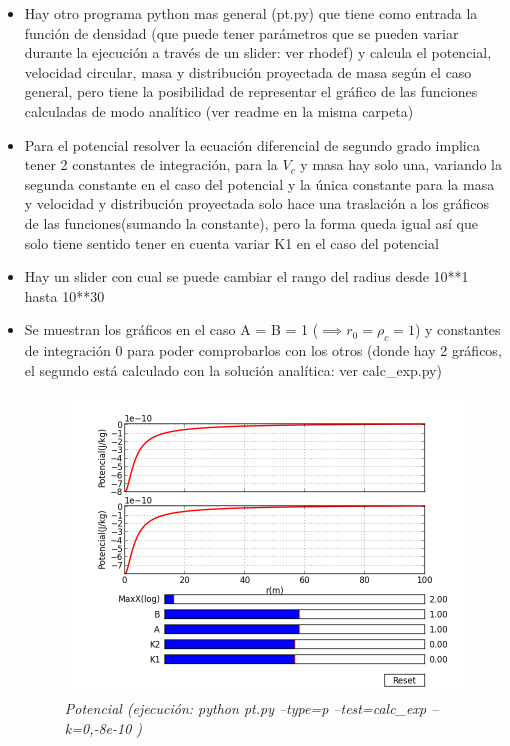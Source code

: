 \documentclass[12pt]{book}
\begin{document}
\begin{itemize}

	\item Hay otro programa python mas general  (pt.py)  que tiene como entrada la función de densidad (que puede tener parámetros que se pueden variar durante la ejecución a través de un slider: ver rhodef) y calcula el potencial, velocidad circular, masa y distribución proyectada de masa según el caso general, pero tiene la posibilidad de representar el gráfico de las funciones calculadas de modo analítico (ver readme en la misma carpeta)
\item Para el potencial resolver la ecuación diferencial de segundo grado implica tener 2 constantes de integración, para la $V_c$ y masa hay solo una, variando la segunda constante en el caso del potencial y la única constante para la masa y velocidad y distribución proyectada solo hace una traslación a los gráficos de las funciones(sumando la constante), pero la forma queda igual así que solo tiene sentido tener en cuenta variar K1 en el caso del potencial 
\item Hay un slider con cual se puede cambiar el rango del radius desde 10**1 hasta 10**30
\item Se muestran los gráficos en el caso A = B = 1 ($\implies r_0= \rho_c =1$) y constantes de integración 0 para poder comprobarlos con los otros (donde hay 2 gráficos, el segundo está calculado con la solución analítica: ver calc\_exp.py)

\begin{figure}[!ht]
 \centering
 \includegraphics[scale=0.33]{pt_pot_A1_B1.png}
 \caption{\emph{Potencial (ejecución: python pt.py --type=p --test=calc\_exp --k=0,-8e-10 )}}
\end{figure}


\end{itemize}
\end{document}
